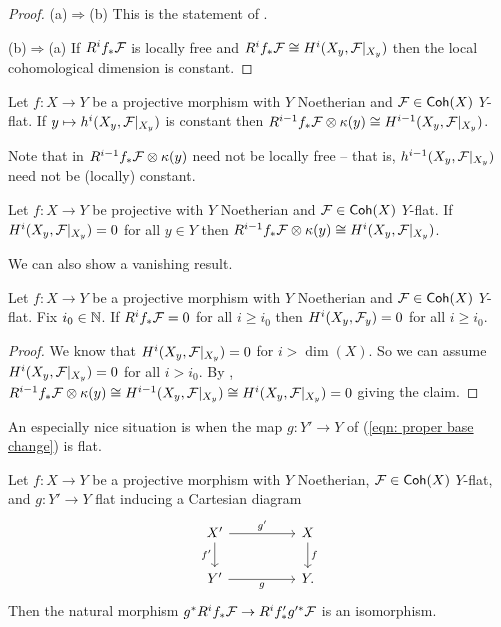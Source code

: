 \begin{proof}
    (a)$\Rightarrow$(b) This is the statement of . 

    (b)$\Rightarrow$(a) If $R^{i}f_{*}\mathcal{F}$ is locally free and $R^{i}f_{*}\mathcal{F}\cong H^{i}(X_{y},\mathcal{F}|_{X_{y}})$ then the local cohomological dimension is constant. 
\end{proof}
\begin{corollary}\label{corr: also free in -1}
    Let $f:X\to Y$ be a projective morphism with $Y$ Noetherian and $\mathcal{F}\in\mathsf{Coh}(X)$ $Y$-flat. If $y\mapsto h^{i}(X_{y},\mathcal{F}|_{X_{y}})$ is constant then $R^{i-1}f_{*}\mathcal{F}\otimes\kappa(y)\cong H^{i-1}(X_{y},\mathcal{F}|_{X_{y}})$. 
\end{corollary}
\begin{remark}
    Note that in  $R^{i-1}f_{*}\mathcal{F}\otimes\kappa(y)$ need not be locally free -- that is, $h^{i-1}(X_{y},\mathcal{F}|_{X_{y}})$ need not be (locally) constant. 
\end{remark}
\begin{corollary}\label{corr: vanishing in degree -1}
    Let $f:X\to Y$ be projective with $Y$ Noetherian and $\mathcal{F}\in\mathsf{Coh}(X)$ $Y$-flat. If $H^{i}(X_{y},\mathcal{F}|_{X_{y}})=0$ for all $y\in Y$ then $R^{i-1}f_{*}\mathcal{F}\otimes\kappa(y)\cong H^{i}(X_{y},\mathcal{F}|_{X_{y}})$. 
\end{corollary}
We can also show a vanishing result. 
\begin{proposition}\label{prop: cohomology base change vanishing}
    Let $f:X\to Y$ be a projective morphism with $Y$ Noetherian and $\mathcal{F}\in\mathsf{Coh}(X)$ $Y$-flat. Fix $i_{0}\in\mathbb{N}$. If $R^{i}f_{*}\mathcal{F}=0$ for all $i\geq i_{0}$ then $H^{i}(X_{y},\mathcal{F}_{y})=0$ for all $i\geq i_{0}$. 
\end{proposition}
\begin{proof}
    We know that $H^{i}(X_{y},\mathcal{F}|_{X_{y}})=0$ for $i>\dim(X)$. So we can assume $H^{i}(X_{y},\mathcal{F}|_{X_{y}})=0$ for all $i>i_{0}$. By , $R^{i-1}f_{*}\mathcal{F}\otimes\kappa(y)\cong H^{i-1}(X_{y},\mathcal{F}|_{X_{y}})\cong H^{i}(X_{y},\mathcal{F}|_{X_{y}})=0$ giving the claim. 
\end{proof}
An especially nice situation is when the map $g:Y'\to Y$ of (\ref{eqn: proper base change}) is flat. 
\begin{theorem}\label{thm: flat base change}
    Let $f:X\to Y$ be a projective morphism with $Y$ Noetherian, $\mathcal{F}\in\mathsf{Coh}(X)$ $Y$-flat, and $g:Y'\to Y$ flat inducing a Cartesian diagram 
    $$%
    \begin{tikzcd}
        {X'} && X \\
        {Y'} && Y.
        \arrow["{g'}", from=1-1, to=1-3]
        \arrow["{f'}"', from=1-1, to=2-1]
        \arrow["f", from=1-3, to=2-3]
        \arrow["g"', from=2-1, to=2-3]
    \end{tikzcd}$$
    Then the natural morphism $g^{*}R^{i}f_{*}\mathcal{F}\to R^{i}f'_{*}g'^{*}\mathcal{F}$ is an isomorphism. 
\end{theorem}
